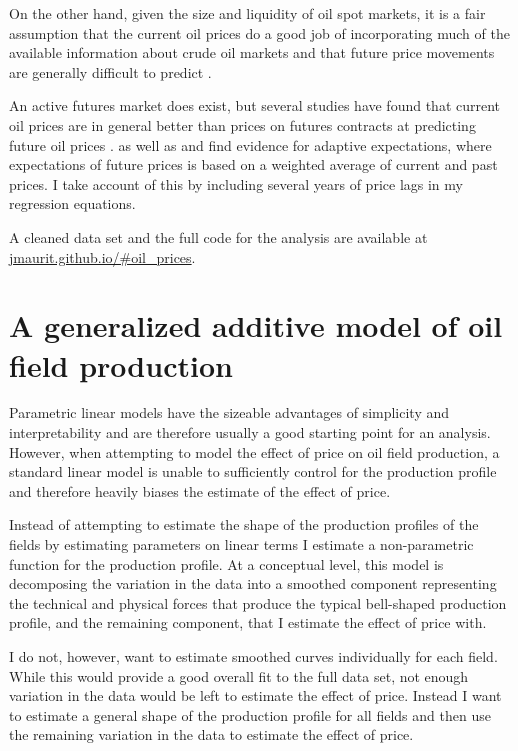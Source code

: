\documentclass[11pt]{article}
\begin{document}
On the other hand, given the size and liquidity of oil spot markets, it is a fair assumption that the current oil prices do a good job of incorporating much of the available information about crude oil markets and that future price movements are generally difficult to predict \citep{hamilton_understanding_2008}.

An active futures market does exist, but several studies have found that current oil prices are in general better than prices on futures contracts at predicting future oil prices \citep{alquist_what_2010, chinn_predictive_2005}.  \citet{mohn_investment_2008} as well as \citet{pesaran_econometric_1990} and \citet{farzin_impact_2001} find evidence for adaptive expectations, where expectations of future prices is based on a weighted average of current and past prices.  I take account of this by including several years of price lags in my regression equations.  

A cleaned data set and the full code for the analysis are available at \url{jmaurit.github.io/#oil_prices}.

\section{A generalized additive model of oil field production}
Parametric linear models have the sizeable advantages of simplicity and interpretability and are therefore usually a good starting point for an analysis. However, when attempting to model the effect of price on oil field production, a standard linear model is unable to sufficiently control for the production profile and therefore heavily biases the estimate of the effect of price.
  
Instead of attempting to estimate the shape of the production profiles of the fields by estimating parameters on linear terms I estimate a non-parametric function for the production profile. At a conceptual level, this model is decomposing the variation in the data into a smoothed component representing the technical and physical forces that produce the typical bell-shaped production profile, and the remaining component, that I estimate the effect of price with.  

I do not, however, want to estimate smoothed curves individually for each field. While this would provide a good overall fit to the full data set, not enough variation in the data would be left to estimate the effect of price.  Instead I want to estimate a general shape of the production profile for all fields and then use the remaining variation in the data to estimate the effect of price.  
\end{document}
